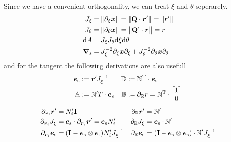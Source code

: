 \documentclass[a4paper,11pt]{article}
\newcommand{\ta}[1]{\text{\boldmath $#1$}} %
\newcommand{\ts}[1]{\text{\boldmath $\mathrm{#1}$}} %
\newcommand{\uv}[1]{\mathbb{#1}}
\newcommand{\um}[1]{\mathbb{#1}}
\newcommand{\dif}[1]{\mathrm{d}#1}
\newcommand{\diff}{\ta{\nabla}}
\newcommand{\pderiv}[2]{\partial_{#2} #1}
\newcommand{\norm}[1]{\left\lVert{#1}\right\rVert}
\newcommand{\T}{\mathrm{T}}
\newcommand{\surf}{\mathrm{s}}
\newcommand{\defeq}{:=}
\begin{document}
Since we have a convenient orthogonality, we can treat $\xi$ and $\theta$ seperarely.
\begin{align}
 J_\xi &= \norm{\pderiv{\ta x}{\xi}} = \norm{\ts Q \cdot \ta r'} = \norm{\ta r'}\\
 J_\theta &= \norm{\pderiv{\ta x}{\theta}} = \norm{\ts Q' \cdot \ta r} = r \\
 \dif A &= J_\xi J_\theta \dif \xi \dif \theta \\
 \diff_\surf &= J_\xi^{-2} \pderiv{\ta x}{\xi}\pderiv{}{\xi} + J_\theta^{-2} \pderiv{\ta x}{\theta}\pderiv{}{\theta}
\end{align}
and for the tangent the following derivations are also usefull
\begin{align}
 \ta e_\surf &\defeq \ta r' J_\xi^{-1} & \uv D &\defeq \um N^\T \cdot \ta e_\surf\\
 \uv A &\defeq {\um N}'^\T \cdot \ta e_\surf & \uv B &\defeq \pderiv{r}{\uv R} = {\um N}^\T \cdot \begin{bmatrix}1\\0\end{bmatrix}\\
\end{align}
\begin{align}
 \pderiv{\ta r'}{\ta r_i} &= N_i' \ts I
	& \pderiv{\ta r'}{\uv R} &= \um N'\\
 \pderiv{J_\xi}{\ta r_i} &= \ta e_\surf \cdot \pderiv{\ta r'}{\ta r_i} = \ta e_\surf N_i'
	& \pderiv{J_\xi}{\uv R} &= \ta e_\surf\cdot \um N' \\
 \pderiv{\ta e_\surf}{\ta r_i} &= (\ts I - \ta e_\surf\otimes\ta e_\surf)N_i' J_\xi^{-1}
	& \pderiv{\ta e_\surf}{\uv R} &= (\ts I - \ta e_\surf \otimes \ta e_\surf )\cdot \um N' J_\xi^{-1}
\end{align}
\end{document}
